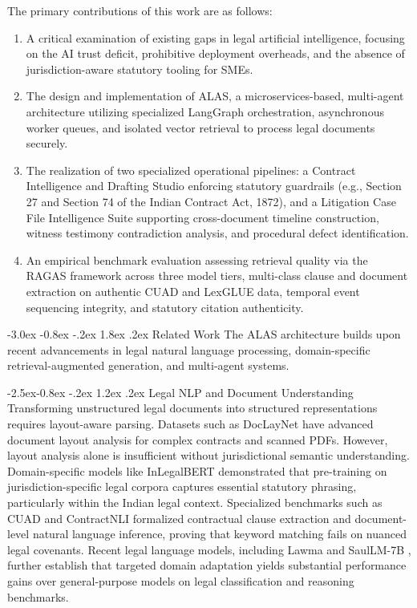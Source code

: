 \documentclass[3p,times,procedia]{elsarticle}
\makeatletter
\renewcommand\section{\@startsection {section}{1}{\z@}%
                                   {-3.0ex \@plus -0.8ex \@minus -.2ex}%
                                   {1.8ex \@plus.2ex}%
                                   {\fontsize{10}{12}\selectfont\bfseries\scshape}}
\renewcommand\subsection{\@startsection{subsection}{2}{\z@}%
                                     {-2.5ex\@plus -0.8ex \@minus -.2ex}%
                                     {1.2ex \@plus .2ex}%
                                     {\fontsize{10}{12}\selectfont\itshape}}
\makeatother
\begin{document}
The primary contributions of this work are as follows:
\begin{enumerate}
\item A critical examination of existing gaps in legal artificial intelligence, focusing on the AI trust deficit, prohibitive deployment overheads, and the absence of jurisdiction-aware statutory tooling for SMEs.
\item The design and implementation of ALAS, a microservices-based, multi-agent architecture utilizing specialized LangGraph orchestration, asynchronous worker queues, and isolated vector retrieval to process legal documents securely.
\item The realization of two specialized operational pipelines: a Contract Intelligence and Drafting Studio enforcing statutory guardrails (e.g., Section 27 and Section 74 of the Indian Contract Act, 1872), and a Litigation Case File Intelligence Suite supporting cross-document timeline construction, witness testimony contradiction analysis, and procedural defect identification.
\item An empirical benchmark evaluation assessing retrieval quality via the RAGAS framework across three model tiers, multi-class clause and document extraction on authentic CUAD and LexGLUE data, temporal event sequencing integrity, and statutory citation authenticity.
\end{enumerate}

\section{Related Work}
The ALAS architecture builds upon recent advancements in legal natural language processing, domain-specific retrieval-augmented generation, and multi-agent systems.

\subsection{Legal NLP and Document Understanding}
Transforming unstructured legal documents into structured representations requires layout-aware parsing. Datasets such as DocLayNet \cite{pfitzmann2022doclaynet} have advanced document layout analysis for complex contracts and scanned PDFs. However, layout analysis alone is insufficient without jurisdictional semantic understanding. Domain-specific models like InLegalBERT \cite{paul2022inlegalbert} demonstrated that pre-training on jurisdiction-specific legal corpora captures essential statutory phrasing, particularly within the Indian legal context. Specialized benchmarks such as CUAD \cite{hendrycks2021cuad} and ContractNLI \cite{koreeda2021contractnli} formalized contractual clause extraction and document-level natural language inference, proving that keyword matching fails on nuanced legal covenants. Recent legal language models, including Lawma \cite{dominguez2024lawma} and SaulLM-7B \cite{colombo2024saullm}, further establish that targeted domain adaptation yields substantial performance gains over general-purpose models on legal classification and reasoning benchmarks.
\end{document}
